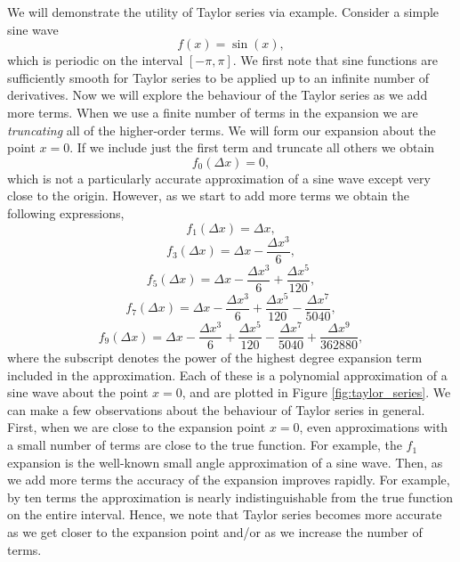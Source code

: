 We will demonstrate the utility of Taylor series via example. Consider a simple sine wave 
\begin{equation}
	f(x) = \sin(x),
\end{equation}
which is periodic on the interval $[- \pi, \pi]$. We first note that sine functions are sufficiently smooth for Taylor series to be applied up to an infinite number of derivatives. Now we will explore the behaviour of the Taylor series as we add more terms. When we use a finite number of terms in the expansion we are {\it truncating} all of the higher-order terms. We will form our expansion about the point $x = 0$. If we include just the first term and truncate all others we obtain
\begin{equation}
	f_0(\Delta x) = 0,
\end{equation}
which is not a particularly accurate approximation of a sine wave except very close to the origin. However, as we start to add more terms we obtain the following expressions,
\begin{equation}
	f_1(\Delta x) = \Delta x,
\end{equation}
\begin{equation}
	f_3(\Delta x) = \Delta x - \frac{\Delta x^3}{6},
\end{equation}
\begin{equation}
	f_5(\Delta x) = \Delta x - \frac{\Delta x^3}{6} + \frac{\Delta x^5}{120},
\end{equation}
\begin{equation}
	f_7(\Delta x) = \Delta x - \frac{\Delta x^3}{6} + \frac{\Delta x^5}{120} - \frac{\Delta x^7}{5040},
\end{equation}
\begin{equation}
	f_{9}(\Delta x) = \Delta x - \frac{\Delta x^3}{6} + \frac{\Delta x^5}{120} - \frac{\Delta x^7}{5040} + \frac{\Delta x^9}{362880},
\end{equation}
where the subscript denotes the power of the highest degree expansion term included in the approximation. Each of these is a polynomial approximation of a sine wave about the point $x=0$, and are plotted in Figure \ref{fig:taylor_series}. We can make a few observations about the behaviour of Taylor series in general. First, when we are close to the expansion point $x=0$, even approximations with a small number of terms are close to the true function. For example, the $f_1$ expansion is the well-known small angle approximation of a sine wave. Then, as we add more terms the accuracy of the expansion improves rapidly. For example, by ten terms the approximation is nearly indistinguishable from the true function on the entire interval. Hence, we note that Taylor series becomes more accurate as we get closer to the expansion point and/or as we increase the number of terms.
